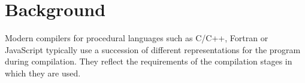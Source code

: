 

\section{Background}

    Modern compilers for procedural languages such as
    C/C++, Fortran or JavaScript typically use a succession of different
    representations for the program during compilation.
    They reflect the requirements of the compilation stages in which they are
    used.

